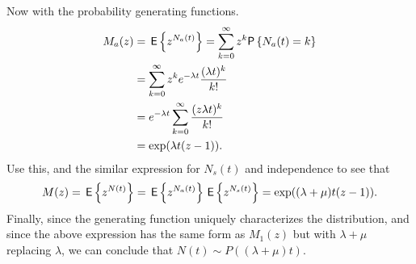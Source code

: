 \begin{question}
\begin{solution}
Now   with the probability generating functions.
      \begin{equation*}
        \begin{split}
          M_a(z) 
&= \E{z^{N_a(t)}} = \sum_{k=0}^\infty z^k \P{N_a(t) = k} \\
&= \sum_{k=0}^\infty z^k e^{-\lambda t} \frac{(\lambda t)^k}{k!} \\
&= e^{-\lambda t} \sum_{k=0}^\infty  \frac{(z \lambda t)^k}{k!} \\
&=\exp(\lambda t (z-1)). 
        \end{split}
      \end{equation*}
      Use this, and the similar expression for $N_s(t)$ and
      independence to see that
\begin{equation*}
M(z) = \,\mathsf{E}\left\{z^{N(t)}\right\} = \,\mathsf{E}\left\{z^{N_a(t)}\right\} \,\mathsf{E}\left\{z^{N_s(t)}\right\} = \exp((\lambda +\mu)t (z-1)). 
\end{equation*}
Finally, since the  generating function uniquely characterizes
the distribution, and since the above expression has the same form as
$M_1(z)$ but with $\lambda+\mu$ replacing $\lambda$, we can conclude that $N(t)\sim P((\lambda +\mu) t)$.
    \end{solution}
\end{question}


